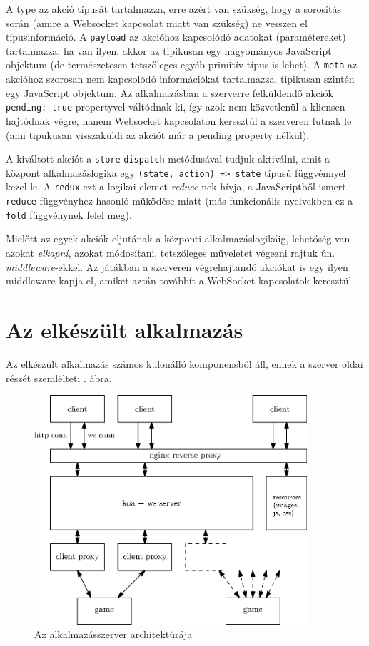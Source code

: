 \documentclass[12pt]{article}
\begin{document}
A type az akció típusát tartalmazza, erre azért van szükség, hogy a sorosítás
során (amire a Websocket kapcsolat miatt van szükség) ne vesszen el
típusinformáció.
A \texttt{payload} az akcióhoz kapcsolódó adatokat (paramétereket) tartalmazza,
ha van ilyen, akkor az tipikusan egy hagyományos JavaScript objektum (de
természetesen tetszőleges egyéb primitív típus is lehet).
A \texttt{meta} az akcióhoz szorosan nem kapcsolódó információkat tartalmazza, tipikusan
szintén egy JavaScript objektum.
Az alkalmazásban a szerverre felküldendő akciók \texttt{pending: true} propertyvel
váltódnak ki, így azok nem közvetlenül a kliensen hajtódnak végre, hanem
Websocket kapcsolaton keresztül a szerveren futnak le (ami tipukusan visszaküldi az
akciót már a pending property nélkül).

A kiváltott akciót a \texttt{store} \texttt{dispatch} metódusával tudjuk aktiválni,
amit a központ alkalmazáslogika egy \texttt{(state, action) => state} típusú
függvénnyel kezel le. A \texttt{redux} ezt a logikai elemet \emph{reduce}-nek hívja,
a JavaScriptből ismert \texttt{reduce} függvényhez hasonló működése miatt (más funkcionális nyelvekben
ez a \texttt{fold} függvénynek felel meg).

Mielőtt az egyek akciók eljutának a központi alkalmazáslogikáig, lehetőség van
azokat \emph{elkapni}, azokat módosítani, tetszőleges műveletet végezni rajtuk ún. \emph{middleware}-ekkel.
Az játákban a szerveren végrehajtandó akciókat is egy ilyen middleware kapja el,
amiket aztán továbbít a WebSocket kapcsolatok keresztül.

\section{Az elkészült alkalmazás}

Az elkészült alkalmazás számos különálló komponensből áll, ennek a szerver oldai
részét szemlélteti . ábra.

\begin{figure}[h!]
  \centering
  \includegraphics[width=0.9\textwidth]{figures/app}
  \caption{Az alkalmazásszerver architektúrája}
  \label{fig:app-arch}
\end{figure}
\end{document}
